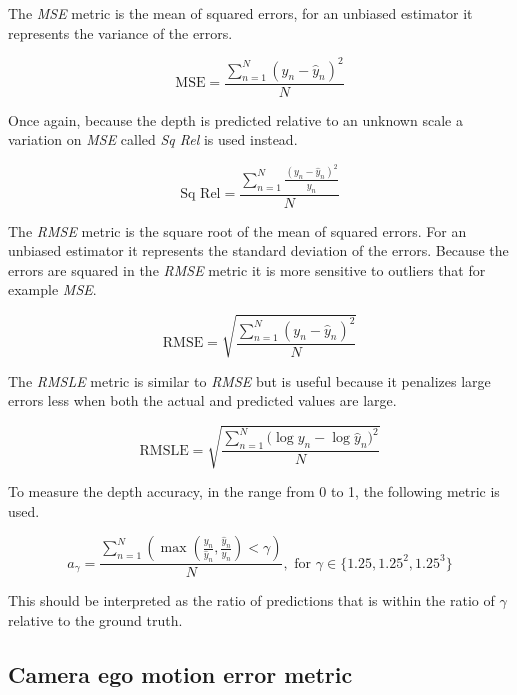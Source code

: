 The \textit{MSE} metric is the mean of squared errors, for an unbiased estimator it represents the variance of the errors. 

\begin{equation}
\textrm{MSE}=\frac{\sum^N_{n=1}{(y_n-\hat{y}_n)^2}}{N}
\end{equation}

Once again, because the depth is predicted relative to an unknown scale a variation on \textit{MSE} called \textit{Sq Rel} is used instead.

\begin{equation}
\textrm{Sq Rel}=\frac{\sum^N_{n=1}{\frac{(y_n-\hat{y}_n)^2}{y_n}}}{N}
\end{equation}

The \textit{RMSE} metric is the square root of the mean of squared errors. For an unbiased estimator it represents the standard deviation of the errors. Because the errors are squared in the \textit{RMSE} metric it is more sensitive to outliers that for example \textit{MSE}.

\begin{equation}
\textrm{RMSE}=\sqrt{\frac{\sum^N_{n=1}{(y_n-\hat{y}_n)^2}}{N}}
\end{equation}

The \textit{RMSLE} metric is similar to \textit{RMSE} but is useful because it penalizes large errors less when both the actual and predicted values are large.

\begin{equation}
\textrm{RMSLE}=\sqrt{\frac{\sum^N_{n=1}{(\log{y_n}-\log{\hat{y}_n)}^2}}{N}}
\end{equation}

To measure the depth accuracy, in the range from 0 to 1, the following metric is used.

\begin{equation}
a_{\gamma} = \frac{\sum^N_{n=1}{(\max(\frac{y_n}{\hat{y}_n}, \frac{\hat{y}_n}{y_n}) < \gamma)}}{N},\textrm{ for }\gamma \in \{1.25, 1.25^2, 1.25^3\}
\end{equation}

This should be interpreted as the ratio of predictions that is within the ratio of $ \gamma $ relative to the ground truth.

\subsection{Camera ego motion error metric}
\label{sec:egometric}

